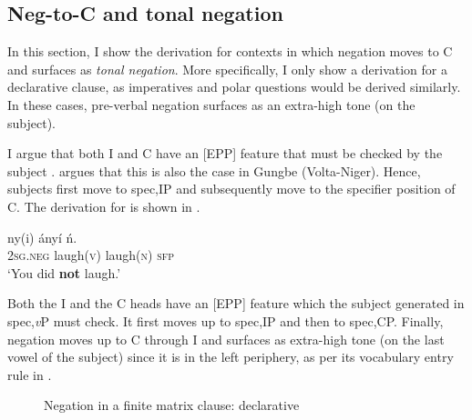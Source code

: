\documentclass[output=paper,colorlinks,citecolor=brown,
]{langscibook}
\begin{document}
\subsection{Neg-to-C and tonal negation}

In this section, I show the derivation for contexts in which negation moves to C\xhead{} and surfaces as \textit{tonal negation}. More specifically, I only show a derivation for a declarative clause, as imperatives and polar questions would be derived similarly. In these cases, pre-verbal negation surfaces as an extra-high tone (on the subject).

I argue that both I and C have an [EPP] feature that must be checked by the subject \citep{chomsky2000minimalist}. \citet{aboh2006complementation} argues that this is also the case in Gungbe (Volta-Niger). Hence, subjects first move to spec,IP and subsequently move to the specifier position of C. The derivation for  is shown in . 

\ea \label{ex:chaperon:decl}
\gll {} ny(i) \'{a}ny\'{i} \'{n}.\\  
\textsc{2sg.neg} laugh(\textsc{v}) laugh(\textsc{n}) \textsc{sfp} \\
\glt `You did \textbf{not} laugh.' 
\z

Both the I and the C heads have an [EPP] feature which the subject generated in spec,\textit{v}P must check. It first moves up to spec,IP and then to spec,CP. %
Finally, negation moves up to C\xhead{} through I\xhead{} and surfaces as extra-high tone (on the last vowel of the subject) since it is in the left periphery, as per its vocabulary entry rule in . 

\begin{figure}
\caption{Negation in a finite matrix clause: declarative}
  \label{fig:chaperon:decl}
\end{figure}
\end{document}
